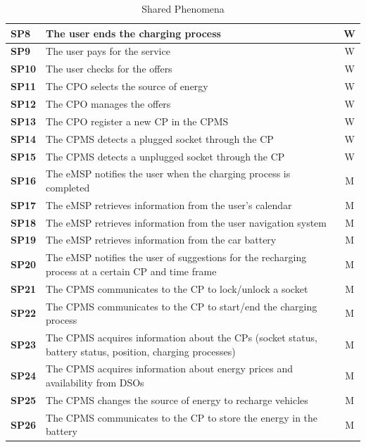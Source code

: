 \documentclass{Configuration_Files/PoliMi3i_thesis}
\begin{document}
\begin{table}[H]
\begin{xltabular}{\textwidth}{| >{}p{3em}|X|c|}
    \textbf{SP8} & The user ends the charging process & W\B\\
    \hline
    \textbf{SP9} & The user pays for the service & W\B\\
    \hline
    \textbf{SP10} & The user checks for the offers & W\B\\
    \hline
    \textbf{SP11} & The CPO selects the source of energy & W\B\\
    \hline
    \textbf{SP12} & The CPO manages the offers & W\B\\
    \hline
    \textbf{SP13} & The CPO register a new CP in the CPMS & W\B\\
    \hline
    \textbf{SP14} & The CPMS detects a plugged socket through the CP & W\B\\
    \hline
    \textbf{SP15} & The CPMS detects a unplugged socket through the CP & W\B\\
    \hline
    \textbf{SP16} & The eMSP notifies the user when the charging process is completed & M\B\\
    \hline
    \textbf{SP17} & The eMSP retrieves information from the user's calendar & M\B\\
    \hline
    \textbf{SP18} & The eMSP retrieves information from the user navigation system & M\B\\
    \hline
    \textbf{SP19} & The eMSP retrieves information from the car battery & M\B\\
    \hline
    \textbf{SP20} & The eMSP notifies the user of suggestions for the recharging process at a certain CP and time frame & M\B\\
    \hline
    \textbf{SP21} & The CPMS communicates to the CP to lock/unlock a socket & M\B\\
    \hline
    \textbf{SP22} & The CPMS communicates to the CP to start/end the charging process & M\B\\
    \hline
    \textbf{SP23} & The CPMS acquires information about the CPs (socket status, battery status, position, charging processes) & M\B\\
    \hline
    \textbf{SP24} & The CPMS acquires information about energy prices and availability from DSOs & M\B\\
    \hline
    \textbf{SP25} & The CPMS changes the source of energy to recharge vehicles & M\B\\
    \hline
    \textbf{SP26} & The CPMS communicates to the CP to store the energy in the battery & M\B\\
    \hline
    \end{xltabular}
    \caption{Shared Phenomena}
\end{table}
\end{document}
